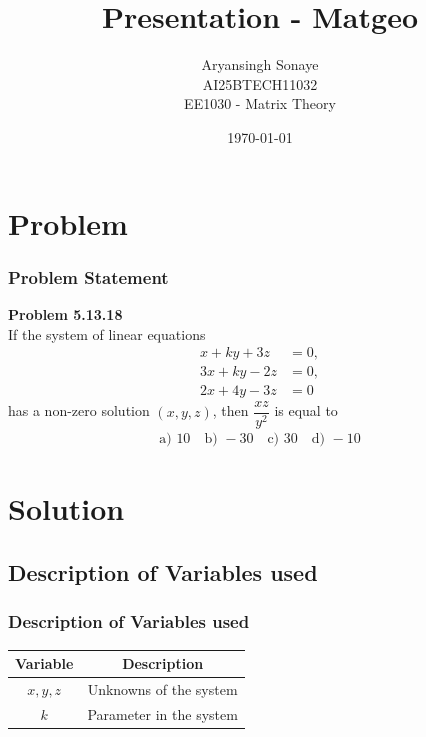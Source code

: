 \documentclass{beamer}
\title{Presentation - Matgeo}
\author{Aryansingh Sonaye \\
AI25BTECH11032 \\
EE1030 - Matrix Theory}
\date{\today}
\theoremstyle{remark}
\numberwithin{equation}{section}
\begin{document}
\begin{frame}
\titlepage
\end{frame}

\section{Problem}
\begin{frame}
\frametitle{Problem Statement}
\textbf{Problem 5.13.18}\\
If the system of linear equations
\begin{align}
x + ky + 3z &= 0, \\
3x + ky - 2z &= 0, \\
2x + 4y - 3z &= 0
\end{align}
has a non-zero solution $(x,y,z)$, then $\dfrac{xz}{y^2}$ is equal to
\begin{align}
\text{a) } 10 \quad \text{b) } -30 \quad \text{c) } 30 \quad \text{d) } -10
\end{align}

\end{frame}

\section{Solution}
\subsection{Description of Variables used}
\begin{frame}
\frametitle{Description of Variables used}
\begin{table}[H]
\centering
\begin{tabular}{|c|c|}
\hline
\textbf{Variable} & \textbf{Description} \\
\hline
$x,y,z$ & Unknowns of the system \\
\hline
$k$ & Parameter in the system \\
\hline
\end{tabular}
\end{table}



\end{frame}
\end{document}
